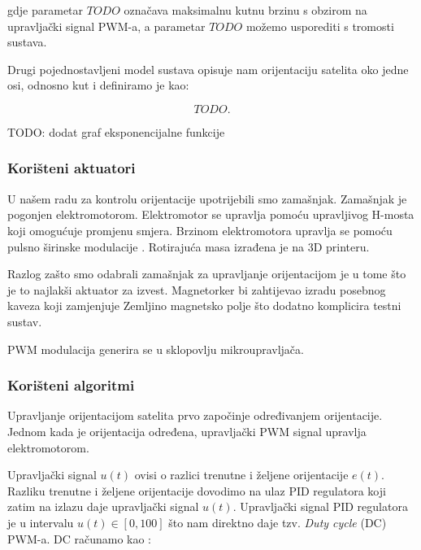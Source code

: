 \documentclass[times, utf8, diplomski, numeric]{templates/template}
\begin{document}
{{{{                gdje parametar $TODO$ označava maksimalnu kutnu brzinu s obzirom na upravljački signal PWM-a, a parametar $TODO$ možemo usporediti s tromosti sustava.
                
                Drugi pojednostavljeni model sustava opisuje nam orijentaciju satelita oko jedne osi, odnosno kut i definiramo je kao:

                \begin{equation}
                    TODO.
                \end{equation}

                TODO: dodat graf eksponencijalne funkcije
            }

            \subsubsection{Korišteni aktuatori}{
                U našem radu za kontrolu orijentacije upotrijebili smo zamašnjak. Zamašnjak je pogonjen elektromotorom. Elektromotor se upravlja pomoću upravljivog H-mosta koji omogućuje promjenu smjera. Brzinom elektromotora upravlja se pomoću pulsno širinske modulacije . Rotirajuća masa izrađena je na 3D printeru.

                Razlog zašto smo odabrali zamašnjak za upravljanje orijentacijom je u tome što je to najlakši aktuator za izvest. Magnetorker bi zahtijevao izradu posebnog kaveza koji zamjenjuje Zemljino magnetsko polje što dodatno komplicira testni sustav.

                PWM modulacija generira se u sklopovlju mikroupravljača.
            }

            \subsubsection{Korišteni algoritmi}{
                Upravljanje orijentacijom satelita prvo započinje određivanjem orijentacije. Jednom kada je orijentacija određena, upravljački PWM signal upravlja elektromotorom.

                Upravljački signal $u(t)$ ovisi o razlici trenutne i željene orijentacije $e(t)$. Razliku trenutne i željene orijentacije dovodimo na ulaz PID regulatora koji zatim na izlazu daje upravljački signal $u(t)$. Upravljački signal PID regulatora je u intervalu $u(t) \in \left[ 0, 100 \right]$ što nam direktno daje tzv. \emph{Duty cycle} (DC) PWM-a. DC računamo kao \cite{dc_pwm}:

}}}}
\end{document}
